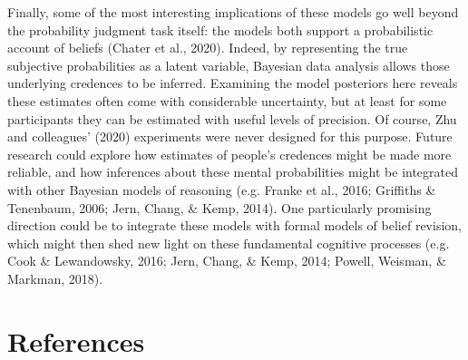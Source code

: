 \documentclass[
  english,
  man,floatsintext]{apa6}
\begin{document}
Finally, some of the most interesting implications of these models go well beyond the probability judgment task itself: the models both support a probabilistic account of beliefs (Chater et al., 2020). Indeed, by representing the true subjective probabilities as a latent variable, Bayesian data analysis allows those underlying credences to be inferred. Examining the model posteriors here reveals these estimates often come with considerable uncertainty, but at least for some participants they can be estimated with useful levels of precision. Of course, Zhu and colleagues' (2020) experiments were never designed for this purpose. Future research could explore how estimates of people's credences might be made more reliable, and how inferences about these mental probabilities might be integrated with other Bayesian models of reasoning (e.g. Franke et al., 2016; Griffiths \& Tenenbaum, 2006; Jern, Chang, \& Kemp, 2014). One particularly promising direction could be to integrate these models with formal models of belief revision, which might then shed new light on these fundamental cognitive processes (e.g. Cook \& Lewandowsky, 2016; Jern, Chang, \& Kemp, 2014; Powell, Weisman, \& Markman, 2018).

\newpage

\hypertarget{references}{%
\section*{References}\label{references}}
\end{document}
